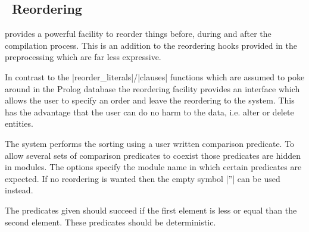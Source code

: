 \subsection{\ProCom\ Reordering}\label{procom:reordering}

\ProCom{} provides a powerful facility to reorder things before, during and
after the compilation process. This is an addition to the reordering hooks
provided in the preprocessing which are far less expressive.

In contrast to the |reorder_literals|/|clauses| functions which are assumed to
poke around in the Prolog database the \ProCom{} reordering facility provides
an interface which allows the user to specify an order and leave the
reordering to the system. This has the advantage that the user can do no harm
to the data, i.e. alter or delete entities.

The system performs the sorting using a user written comparison predicate. To
allow several sets of comparison predicates to coexist those predicates are
hidden in modules. The options specify the module name in which certain
predicates are expected. If no reordering is wanted then the empty symbol |''|
can be used instead.

The predicates given should succeed if the first element is less or equal than
the second element. These predicates should be deterministic.


